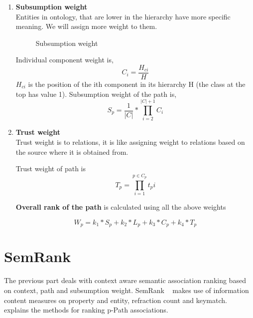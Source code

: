 \begin{enumerate}
\begin{enumerate}
\item{\textbf{Subsumption weight}}\\
Entities in ontology, that are lower in the hierarchy have more specific meaning. We will assign more weight to them.

\begin{figure}[h]
\begin{center}
\end{center}
\caption{Subsumption weight}
\end{figure}

Individual component weight is,
\begin{equation}
	C_i	=	\frac{H_{ci}}{H}
\end{equation}
	$H_{ci}$ is the position of the ith component in its hierarchy H (the class at the top has value 1).
Subsumption weight of the path is,
\begin{equation}
	S_p	=	\frac{1}{|C|} * \prod_{i=2}^{|C|+1} C_i
\end{equation}


\item{\textbf{Trust weight}}\\
Trust weight is to relations, it is like assigning weight to relations based on the source where it is obtained from.

Trust weight of path is 
\begin{equation}
T_p = \prod_{i=1}^{p \in C_p} t_pi
\end{equation}

\textbf{Overall rank of the path} is calculated using all the above weights


\begin{equation}
\boxed{W_p = k_1 * S_p + k_2 * L_p + k_3 * C_p + k_4 * T_p }
\end{equation}

\end{enumerate}
\end{enumerate}

\section{SemRank}
The previous part deals with context aware semantic association ranking based on context, path and subsumption weight. SemRank ~\citep{Anyanwu} makes use of information content measures on property and entity, refraction count and keymatch. ~\cite{Anyanwu} explains the methods for ranking p-Path associations.\\

